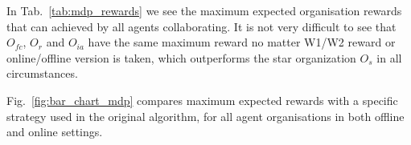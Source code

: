 \documentclass{llncs}
\begin{document}
\begin{table}
\centering
{}
\caption{Maximal rewards that can be achieved by agent organisations from Fig.~\ref{fig:network_configurations} using Alg.~\ref{alg:join_team_nondet}'s offline and online versions defined in Alg.~\ref{alg:main_process}.}
\label{tab:mdp_rewards}
\end{table}

In Tab.~\ref{tab:mdp_rewards} we see the maximum expected organisation rewards that can achieved by all agents collaborating. It is not very difficult to see that $O_{fc}$, $O_r$ and $O_{ia}$ have the same maximum reward no matter W1/W2 reward or online/offline version is taken, which outperforms the star organization $O_s$ in all circumstances.

Fig.~\ref{fig:bar_chart_mdp} compares maximum expected rewards with a specific strategy used in the original algorithm, for all agent organisations in both offline and online settings.
%
%
\end{document}
